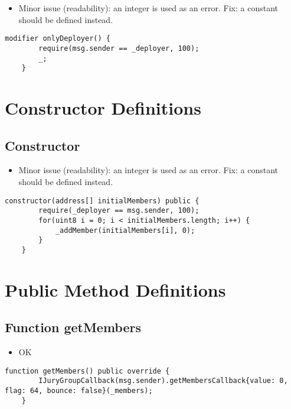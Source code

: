 \begin{itemize}
\item Minor issue (readability): an integer is used as an error. Fix:
  a constant should be defined instead.
\end{itemize}

\begin{lstlisting}[firstnumber=6]
    modifier onlyDeployer() {
        require(msg.sender == _deployer, 100);
        _;
    }
\end{lstlisting}

\section{Constructor Definitions}


\subsection{Constructor}

\begin{itemize}
\item Minor issue (readability): an integer is used as an error. Fix:
  a constant should be defined instead.
\end{itemize}

\begin{lstlisting}[firstnumber=17]
    constructor(address[] initialMembers) public {
        require(_deployer == msg.sender, 100);
        for(uint8 i = 0; i < initialMembers.length; i++) {
            _addMember(initialMembers[i], 0);
        }
    }
\end{lstlisting}

\section{Public Method Definitions}


\subsection{Function getMembers}

\begin{itemize}
\item OK
\end{itemize}

\begin{lstlisting}[firstnumber=45]
    function getMembers() public override {
        IJuryGroupCallback(msg.sender).getMembersCallback{value: 0, flag: 64, bounce: false}(_members);
    }
\end{lstlisting}

